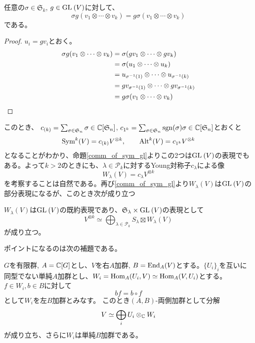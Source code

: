 \documentclass{ltjsreport}
\begin{document}
\begin{prop}\label{comm_of_sym_gl}
  任意の$\sigma\in\mathfrak{S}_k$, $g\in\text{GL}\:(V)$に対して、
  \[
  \sigma g(v_1\otimes\cdots\otimes v_k)
  =
  g \sigma(v_1\otimes\cdots\otimes v_k)
  \]
  である。
\end{prop}

\begin{proof}
  $u_i=gv_i$とおく。
  \begin{align*}
    \sigma g(v_1\otimes\cdots\otimes v_k)
    &=\sigma(gv_1\otimes\cdots\otimes gv_k)\\
    &=\sigma(u_1\otimes\cdots\otimes u_k)\\
    &=u_{\sigma^{-1}(1)}\otimes\cdots\otimes u_{\sigma^{-1}(k)}\\
    &=gv_{\sigma^{-1}(1)}\otimes\cdots\otimes gv_{\sigma^{-1}(k)}\\
    &=g\sigma (v_1\otimes\cdots\otimes v_k)
  \end{align*}
\end{proof}

このとき、
$c_{(k)}=\sum_{\sigma\in \mathfrak{S}_n}\sigma\in\mathbb{C}[\mathfrak{S}_n]$, $c_{1^k}=\sum_{\sigma\in \mathfrak{S}_n}\mathrm{sgn}(\sigma)\sigma\in\mathbb{C}[\mathfrak{S}_n]$とおくと
\[
\text{Sym}^k(V)=c_{(k)}V^{\otimes k},\qquad\text{Alt}^k(V)=c_{1^k}V^{\otimes k}
\]
となることがわかり、命題\ref{comm_of_sym_gl}よりこの2つは$\text{GL}\:(V)$の表現でもある。よって$k>2$のときにも、$\lambda\in\mathcal{P}_k$に対するYoung対称子$c_\lambda$による像
\[
W_\lambda(V)=c_\lambda V^{\otimes k}  
\]
を考察することは自然である。再び\ref{comm_of_sym_gl}より$W_\lambda(V)$は$\text{GL}\:(V)$の部分表現になるが、このとき次が成り立つ

\begin{theo}\label{schur_weyl}
  $W_\lambda(V)$は$\text{GL}\:(V)$の既約表現であり、$\mathfrak{S}_\lambda\times\text{GL}\:(V)$の表現として
  \[
  V^{\otimes k}\simeq \bigoplus_{\lambda\in\mathcal{P}_k}S_\lambda\boxtimes W_\lambda(V)  
  \]
  が成り立つ。
\end{theo}


ポイントになるのは次の補題である。

\begin{lemm}\label{DCT}
  $G$を有限群, $A=\mathbb{C}[G]$とし、$V$を右$A$加群, $B=\text{End}_A(V)$とする。$\{U_i\}_i$を互いに同型でない単純$A$加群とし、$W_i=\text{Hom}_A(U_i,V)\simeq\text{Hom}_A(V,U_i)$とする。$f\in W_i, b\in B$に対して
  \[
  bf=b\circ f  
  \]
  として$W_i$を左$B$加群とみなす。
  このとき$(A,B)$-両側加群として分解
    \[
      V\simeq \bigoplus_iU_i\otimes_{\mathbb{C}} W_i  
    \]
  が成り立ち、さらに$W_i$は単純$B$加群である。
\end{lemm}
\end{document}
